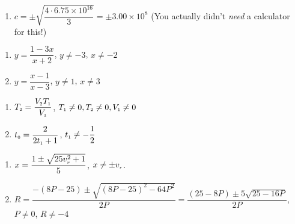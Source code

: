 \begin{enumerate}
\setcounter{enumi}{\value{HW}}
\item $c = \pm \sqrt{\dfrac{4 \cdot 6.75 \times 10^{16}}{3}} = \pm 3.00 \times 10^{8}$ (You actually didn't 
\textit{need} a calculator for this!)

\setcounter{HW}{\value{enumi}}
\end{enumerate}


\begin{multicols}{2}
\begin{enumerate}
\setcounter{enumi}{\value{HW}}


\item $y = \dfrac{1 - 3x}{x+2}$, $y \neq -3$, $x \neq -2$

\item $y = \dfrac{x-1}{x-3}$, $y \neq 1$, $x \neq 3$

\setcounter{HW}{\value{enumi}}
\end{enumerate}
\end{multicols}



\begin{multicols}{2}
\begin{enumerate}
\setcounter{enumi}{\value{HW}}

\item $T_{\text{\tiny $2$}} = \dfrac{V_{\text{\tiny $2$}}T_{\text{\tiny $1$}}}{V_{\text{\tiny $1$}}}$, $T_{\text{\tiny $1$}} \neq 0, T_{\text{\tiny $2$}} \neq 0, V_{\text{\tiny $1$}} \neq 0$


\item  $t_{\text{\tiny $0$}} = \dfrac{2}{2t_{\text{\tiny $1$}} + 1}$, $t_{\text{\tiny $1$}} \neq -\dfrac{1}{2}$

\setcounter{HW}{\value{enumi}}
\end{enumerate}
\end{multicols}

\begin{enumerate}
\setcounter{enumi}{\value{HW}}


\item  $x = \dfrac{1 \pm \sqrt{25v_{\text{\tiny $r$}}^2+1}}{5}$, $x \neq \pm v_{\text{\tiny $r$}}$.

\item $R= \dfrac{-(8P-25) \pm \sqrt{(8P-25)^2 - 64P^2}}{2P} = \dfrac{(25-8P) \pm 5 \sqrt{25-16P}}{2P}$, $P \neq 0$, $R \neq -4$

\setcounter{HW}{\value{enumi}}
\end{enumerate}
